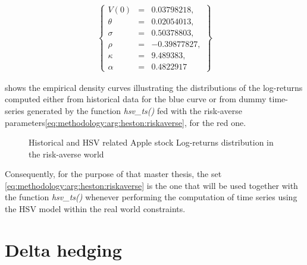 \documentclass[12pt]{report}
\begin{document}
\begin{align}
  \left \{
  \begin{array}{lcl}
    V(0) &= &0.03798218, \\
    \theta &= &0.02054013, \\
    \sigma &= &0.50378803, \\
    \rho &= &-0.39877827, \\
    \kappa &= &9.489383, \\
    \alpha & = &0.4822917
  \end{array}
  \right \}  
  \label{eq:methodology:arg:heston:riskaverse}
\end{align}


 shows the empirical density curves illustrating the distributions of the log-returns computed either from historical data for the blue curve or from dummy time-series generated by the function \textit{hsv\_ts()} fed with the risk-averse parameters\ref{eq:methodology:arg:heston:riskaverse}, for the red one.


\begin{figure}[h]
  \centering
  
  \caption{Historical and HSV related Apple stock Log-returns distribution in the risk-averse world}
  \label{p:methodology:density:aapl:heston:riskaverse}
\end{figure}

Consequently, for the purpose of that master thesis, the set \ref{eq:methodology:arg:heston:riskaverse} is the one that will be used together with the function \textit{hsv\_ts()} whenever performing the computation of time series using the HSV model within the real world constraints.



\section{Delta hedging}
\label{sec:methodology:delta}
\end{document}
